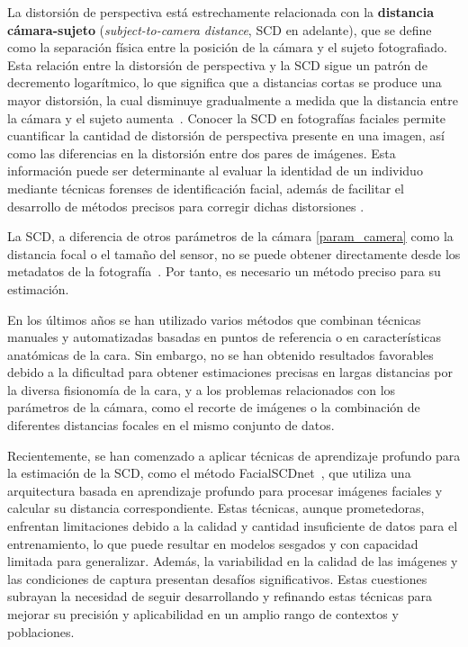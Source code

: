 La distorsión de perspectiva está estrechamente relacionada con la \textbf{distancia cámara-sujeto} (\textit{subject-to-camera distance}, SCD en adelante), que se define como la separación física entre la posición de la cámara y el sujeto fotografiado. Esta relación entre la distorsión de perspectiva y la SCD sigue un patrón de decremento logarítmico, lo que significa que a distancias cortas se produce una mayor distorsión, la cual disminuye gradualmente a medida que la distancia entre la cámara y el sujeto aumenta~\cite{55}. Conocer la SCD en fotografías faciales permite cuantificar la cantidad de distorsión de perspectiva presente en una imagen, así como las diferencias en la distorsión entre dos pares de imágenes. Esta información puede ser determinante al evaluar la identidad de un individuo mediante técnicas forenses de identificación facial, además de facilitar el desarrollo de métodos precisos para corregir dichas distorsiones \cite{16}.

La SCD, a diferencia de otros parámetros de la cámara \ref{param_camera} como la distancia focal o el tamaño del sensor, no se puede obtener directamente desde los metadatos de la fotografía~\cite{8}. Por tanto, es necesario un método preciso para su estimación.

En los últimos años se han utilizado varios métodos que combinan técnicas manuales y automatizadas basadas en puntos de referencia o en características anatómicas de la cara\cite{28,30,20}. Sin embargo, no se han obtenido resultados favorables debido a la dificultad para obtener estimaciones precisas en largas distancias por la diversa fisionomía de la cara, y a los problemas relacionados con los parámetros de la cámara, como el recorte de imágenes o la combinación de diferentes distancias focales en el mismo conjunto de datos.

Recientemente, se han comenzado a aplicar técnicas de aprendizaje profundo para la estimación de la SCD, como el método FacialSCDnet~\cite{14}, que utiliza una arquitectura basada en aprendizaje profundo para procesar imágenes faciales y calcular su distancia correspondiente. Estas técnicas, aunque prometedoras, enfrentan limitaciones debido a la calidad y cantidad insuficiente de datos para el entrenamiento, lo que puede resultar en modelos sesgados y con capacidad limitada para generalizar. Además, la variabilidad en la calidad de las imágenes y las condiciones de captura presentan desafíos significativos. Estas cuestiones subrayan la necesidad de seguir desarrollando y refinando estas técnicas para mejorar su precisión y aplicabilidad en un amplio rango de contextos y poblaciones.

